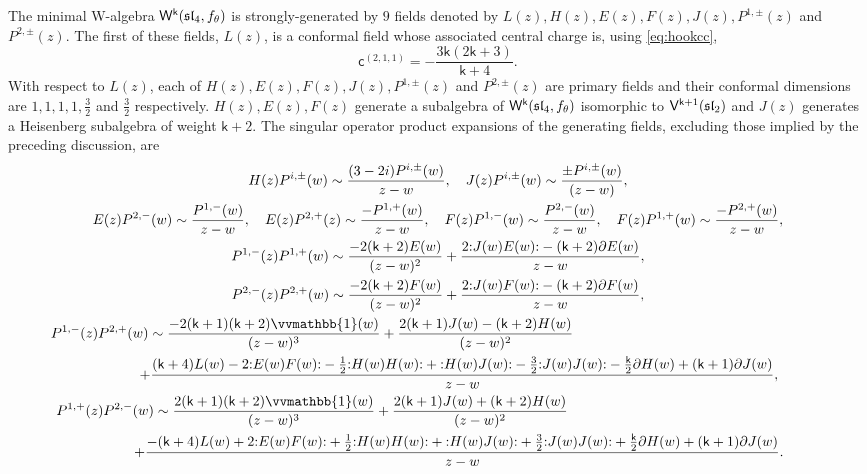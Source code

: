 \documentclass[10pt,a4paper]{amsart}
\numberwithin{equation}{section}
\newcommand{\cc}{\mathsf{c}}   %
\newcommand{\kk}{\mathsf{k}}   %
\newcommand{\wun}{\vvmathbb{1}}  %
\DeclarePairedDelimiter{\brac}{\lparen}{\rparen}   %
\newcommand{\no}[1]{\mathopen{:} #1 \mathclose{:}} %
\newcommand{\alg}[1]{\mathfrak{#1}}  %
\newcommand{\VOA}[1]{\mathsf{#1}}    %
\newcommand{\SLA}[2]{\alg{#1}_{#2}}                      %
\newcommand{\sltwo}{\SLA{sl}{2}}
\newcommand{\slfour}{\SLA{sl}{4}}
\newcommand{\fmin}{f_\theta}                                        %
\newcommand{\Wsymb}{\VOA{W}}
\newcommand{\uaffvoa}[2]{\VOA{V}^{#1}\brac{#2}}                   %
\newcommand{\uQHR}[3]{\Wsymb^{#1}\brac{#2,#3}}                    %
\theoremstyle{plain}
\begin{document}
The minimal W-algebra $\uQHR{\kk}{\slfour}{\fmin}$ is strongly-generated by $9$ fields denoted by $L(z), H(z), E(z), F(z), J(z), P^{1,\pm}(z)$ and $P^{2,\pm}(z)$. The first of these fields, $L(z)$, is a conformal field whose associated central charge is, using \eqref{eq:hookcc},
%
\begin{equation}
    \cc^{(2,1,1)}=-\frac{3\kk (2\kk+3)}{\kk+4}.
\end{equation}
%
With respect to $L(z)$, each of $H(z),E(z),F(z),J(z),P^{1,\pm}(z)$ and $P^{2,\pm}(z)$ are primary fields and their conformal dimensions are $1,1,1,1,\frac{3}{2}$ and $\frac{3}{2}$ respectively. $H(z),E(z),F(z)$ generate a subalgebra of $\uQHR{\kk}{\slfour}{\fmin}$ isomorphic to $\uaffvoa{\kk+1}{\sltwo}$ and $J(z)$ generates a Heisenberg subalgebra of weight $\kk+2$. The singular operator product expansions of the generating fields, excluding those implied by the preceding discussion, are \cite{Ara17Orb}
%
\begin{equation} \label{ope:sl4min}
\begin{gathered}
    H(z)P^{i,\pm}(w) \sim \frac{(3-2i)P^{i,\pm}(w)}{z-w}, \quad
    J(z)P^{i,\pm}(w) \sim \frac{\pm P^{i,\pm}(w)}{(z-w)}, \\
    E(z)P^{2,-}(w) \sim \frac{P^{1,-}(w)}{z-w}, \quad 
    E(z)P^{2,+}(z) \sim \frac{-P^{1,+}(w)}{z-w}, \quad 
    F(z)P^{1,-}(w) \sim \frac{P^{2,-}(w)}{z-w}, \quad 
    F(z)P^{1,+}(w) \sim \frac{-P^{2,+}(w)}{z-w}, \\
    P^{1,-}(z)P^{1,+}(w) \sim \frac{-2 (\kk+2) E(w)}{(z-w)^2} + \frac{2\no{J(w)E(w)} - (\kk+2)\partial E(w)}{z-w}, \\
    P^{2,-}(z)P^{2,+}(w) \sim \frac{-2 (\kk+2) F(w)}{(z-w)^2} + \frac{2\no{J(w)F(w)} - (\kk+2)\partial F(w)}{z-w}, \\
    P^{1,-}(z)P^{2,+}(w) \sim \frac{-2(\kk+1)(\kk+2)\wun(w)}{(z-w)^3} + \frac{2(\kk+1)J(w) - (\kk+2)H(w)}{(z-w)^2} \hspace{18em} \\
        \hspace{3em} +\frac{(\kk+4)L(w) - 2\no{E(w)F(w)} - \frac{1}{2}\no{H(w)H(w)} + \no{H(w)J(w)} - \frac{3}{2}\no{J(w)J(w)} - \frac{\kk}{2} \partial H(w) + (\kk+1) \partial J(w)}{z-w}, \\
    P^{1,+}(z)P^{2,-}(w) \sim \frac{2(\kk+1)(\kk+2)\wun(w)}{(z-w)^3} + \frac{2(\kk+1)J(w) + (\kk+2)H(w)}{(z-w)^2} \hspace{18em} \\
        \hspace{3em} +\frac{-(\kk+4)L(w) + 2\no{E(w)F(w)} + \frac{1}{2}\no{H(w)H(w)} + \no{H(w)J(w)} + \frac{3}{2}\no{J(w)J(w)} + \frac{\kk}{2} \partial H(w) +(\kk+1) \partial J(w)}{z-w}.
\end{gathered}
\end{equation}
\end{document}
